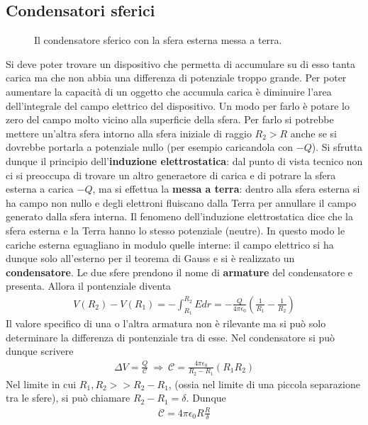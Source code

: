 \documentclass[a4paper, oneside]{article}
\begin{document}
\subsection{Condensatori sferici}
\begin{figure}
    \centering
    \caption{Il condensatore sferico con la sfera esterna messa a terra.}
\end{figure}
Si deve poter trovare un dispositivo che permetta di accumulare su di esso tanta carica 
ma che non abbia una differenza di potenziale troppo grande. Per poter aumentare la capacità 
di un oggetto che accumula carica è diminuire l'area dell'integrale del campo elettrico
del dispositivo. Un modo per farlo è potare lo zero del campo molto vicino alla superficie della sfera.
Per farlo si potrebbe mettere un'altra sfera intorno alla sfera iniziale 
di raggio $R_2 > R$ anche se si dovrebbe portarla a potenziale nullo (per esempio caricandola con $-Q$). 
Si sfrutta dunque il principio dell'\textbf{induzione elettrostatica}: dal punto di vista tecnico non ci si preoccupa 
di trovare un altro generaetore di carica e di potrare la sfera esterna a carica $-Q$, ma si effettua la 
\textbf{messa a terra}: dentro alla sfera esterna si ha campo non nullo e degli elettroni
fluiscano dalla Terra per annullare il campo generato dalla sfera interna. Il fenomeno dell'induzione elettrostatica 
dice che la sfera esterna e la Terra hanno lo stesso potenziale (neutre). In questo modo le cariche esterna eguagliano 
in modulo quelle interne: il campo elettrico si ha dunque solo all'esterno per il teorema di 
Gauss e si è realizzato un \textbf{condensatore}. Le due sfere prendono il nome di \textbf{armature} 
del condensatore e presenta. Allora il pontenziale diventa 
\begin{gather*}
    V(R_2) - V(R_1) = - \int_{R_1}^{R_2} E dr = - \frac{Q}{4\pi\epsilon_0} \left(\frac{1}{R_1} - \frac{1}{R_2}\right) 
\end{gather*}
Il valore specifico di una o l'altra armatura non è rilevante ma si può solo determinare la differenza di pontenziale 
tra di esse. Nel condensatore si può dunque scrivere
\begin{gather*}
    \Delta V = \frac{Q}{\mathcal{C}} \ \Longrightarrow \ \mathcal{C} = \frac{4\pi\epsilon_0}{R_2 - R_1}(R_1R_2) 
\end{gather*}
Nel limite in cui $R_1, R_2 >> R_2 - R_1$, (ossia nel limite di una piccola separazione tra le sfere),
si può chiamare $R_2 - R_1 = \delta$.  Dunque 
\begin{gather*}
    \mathcal{C} = 4\pi\epsilon_0R\frac{R}{\delta}
\end{gather*}
\end{document}
